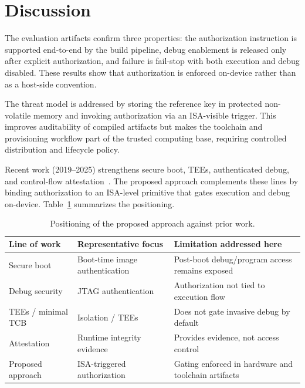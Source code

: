 
\section{Discussion}
\label{sec:discussion}

The evaluation artifacts confirm three properties: the authorization instruction is
supported end-to-end by the build pipeline, debug enablement is released only after
explicit authorization, and failure is fail-stop with both execution and debug
disabled. These results show that authorization is enforced on-device rather than as a
host-side convention.

The threat model is addressed by storing the reference key in protected non-volatile
memory and invoking authorization via an ISA-visible trigger. This improves auditability
of compiled artifacts but makes the toolchain and provisioning workflow part of the
trusted computing base, requiring controlled distribution and lifecycle policy.

Recent work (2019--2025) strengthens secure boot, TEEs, authenticated debug, and
control-flow attestation~\cite{wang2022securebootsurvey,ahmed2025riscvtee,lapeyre2022jtagauth,benyehuda2022nanovised}.
The proposed approach complements these lines by binding authorization to an ISA-level
primitive that gates execution and debug on-device. Table~\ref{tab:discussion-positioning}
summarizes the positioning.

\begin{table}[t]
  \centering
  \footnotesize
  \setlength{\tabcolsep}{3pt}
  \caption{Positioning of the proposed approach against prior work.}
  \label{tab:discussion-positioning}
  \begin{tabular}{@{}>{\raggedright\arraybackslash}p{2.4cm}>{\raggedright\arraybackslash}p{3.1cm}>{\raggedright\arraybackslash}p{3.1cm}@{}}
    \toprule
    \textbf{Line of work} & \textbf{Representative focus} & \textbf{Limitation addressed here} \\
    \midrule
    Secure boot & Boot-time image authentication & Post-boot debug/program access remains exposed \\
    Debug security & JTAG authentication & Authorization not tied to execution flow \\
    TEEs / minimal TCB & Isolation / TEEs & Does not gate invasive debug by default \\
    Attestation & Runtime integrity evidence & Provides evidence, not access control \\
    Proposed approach & ISA-triggered authorization & Gating enforced in hardware and toolchain artifacts \\
    \bottomrule
  \end{tabular}
\end{table}
\FloatBarrier

